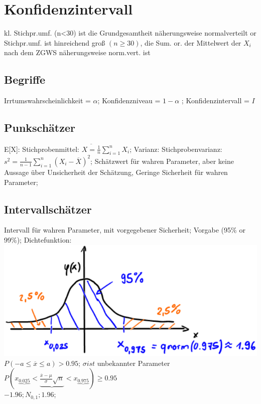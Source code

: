 \section{Konfidenzintervall}
kl. Stichpr.umf. (n<30) ist die Grundgesamtheit näherungsweise normalverteilt or Stichpr.umf. ist hinreichend groß $(n\ge 30) $, die Sum. or. der Mittelwert der $ X_i $ nach dem ZGWS näherungsweise norm.vert. ist
  \subsection{Begriffe}
   Irrtumswahrscheinlichkeit = $ \alpha $; 
  Konfidenzniveau =  $ 1-\alpha $ ; 
  Konfidenzintervall = $ I $
  \subsection{Punkschätzer}
  E[X]: Stichprobenmittel:
  $ \overline{X = \frac{1}{n}} \sum_{i=1}^{n} X_{i}$; 
  Varianz: Stichprobenvarianz:
  $ s^{2} = \frac{1}{n -1} \sum_{i=1}^{n} (X_{i} - \overline{X})^{2} $; 
  Schätzwert für wahren Parameter, aber keine Aussage über Unsicherheit der Schätzung, Geringe Sicherheit für wahren Parameter; 
  
  \subsection{Intervallschätzer}
  Intervall für wahren Parameter, mit vorgegebener Sicherheit; Vorgabe (95\% or 99\%); 
  Dichtefunktion:
  \includegraphics[scale=0.25]{./pic/KonfidenzintervallDichtefunktion.png}
  $ P(-a \le \overline{x} \le a) > 0.95 $; 
  $ \sigma ist $ unbekannter Parameter\\
  $ P( x_{\underbrace{0.025}} < \underbrace{ \frac{\overline{x} - \mu}{\sigma}\sqrt{n} } < x_{\underbrace{0.975}} ) \ge 0.95 $\\
  $ -1.96; N_{0,1}; 1.96 $; 
  
